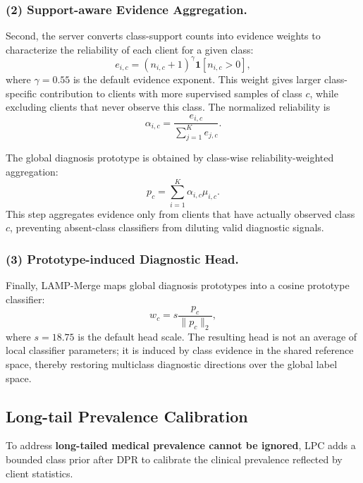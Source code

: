 \documentclass[letterpaper]{article} %
\begin{document}
\subsubsection{(2) Support-aware Evidence Aggregation.}

Second, the server converts class-support counts into evidence weights to characterize the reliability of each client for a given class:
\begin{equation}
e_{i,c}=(n_{i,c}+1)^\gamma \mathbf{1}[n_{i,c}>0],
\end{equation}
where $\gamma=0.55$ is the default evidence exponent. This weight gives larger class-specific contribution to clients with more supervised samples of class $c$, while excluding clients that never observe this class. The normalized reliability is
\begin{equation}
\alpha_{i,c}=\frac{e_{i,c}}{\sum_{j=1}^{K} e_{j,c}}.
\end{equation}

The global diagnosis prototype is obtained by class-wise reliability-weighted aggregation:
\begin{equation}
p_c=\sum_{i=1}^{K}\alpha_{i,c}\mu_{i,c}.
\end{equation}
This step aggregates evidence only from clients that have actually observed class $c$, preventing absent-class classifiers from diluting valid diagnostic signals.

\subsubsection{(3) Prototype-induced Diagnostic Head.}

Finally, LAMP-Merge maps global diagnosis prototypes into a cosine prototype classifier:
\begin{equation}
w_c=s\frac{p_c}{\|p_c\|_2},
\end{equation}
where $s=18.75$ is the default head scale. The resulting head is not an average of local classifier parameters; it is induced by class evidence in the shared reference space, thereby restoring multiclass diagnostic directions over the global label space.

\subsection{Long-tail Prevalence Calibration}

To address \textbf{long-tailed medical prevalence cannot be ignored}, LPC adds a bounded class prior after DPR to calibrate the clinical prevalence reflected by client statistics.
\end{document}
